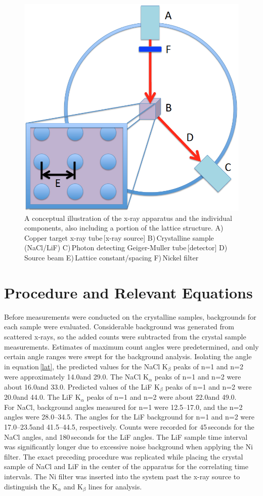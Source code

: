 \documentclass[aps,prl,twocolumn,superscriptaddress,nofootinbib]{revtex4-1}
\begin{document}
  \begin{figure}[h!]
  \begin{center}
\centerline{\includegraphics[width=3.in]{appar.png}}
\caption{ \small{A conceptual illustration of the x-ray apparatus and the individual components, also including a portion of the lattice structure. A)\,Copper target x-ray tube\,[x-ray source] B)\,Crystalline sample\,(NaCl/LiF) C)\,Photon detecting Geiger-Muller tube\,[detector] D)\,Source beam E)\,Lattice constant/spacing F)\,Nickel filter \label{appar}}}
  \end{center}
\end{figure}
\clearpage
\section{Procedure and Relevant Equations}



Before measurements were conducted on the crystalline samples, backgrounds for each sample were evaluated. Considerable background was generated from scattered x-rays, so the added counts were subtracted from the crystal sample measurements. Estimates of maximum count angles were predetermined, and only certain angle ranges were swept for the background analysis. Isolating the angle in equation\,\ref{lat}, the predicted values for the NaCl K$_\beta$ peaks of n=1 and n=2 were approximately 14.0\degree and 29.0\degree. The NaCl K$_\alpha$ peaks of n=1 and n=2 were about 16.0\degree and 33.0\degree. Predicted values of the LiF K$_\beta$ peaks of n=1 and n=2 were 20.0\degree and 44.0\degree. The LiF K$_\alpha$ peaks of n=1 and n=2 were about 22.0\degree and 49.0\degree.
\\
\indent For NaCl, background angles measured for n=1 were 12.5\degree--17.0\degree, and the n=2 angles were 28.0\degree--34.5\degree. The angles for the LiF background for n=1 and n=2 were 17.0\degree--23.5\degree and 41.5\degree--44.5\degree, respectively. Counts were recorded for 45\,seconds for the NaCl angles, and 180\,seconds for the LiF angles. The LiF sample time interval was significantly longer due to excessive noise background when applying the Ni filter. The exact preceding procedure was replicated while placing the crystal sample of NaCl and LiF in the center of the apparatus for the correlating time intervals. The Ni filter was inserted into the system past the x-ray source to distinguish the K$_\alpha$ and K$_\beta$ lines for analysis.
\end{document}
